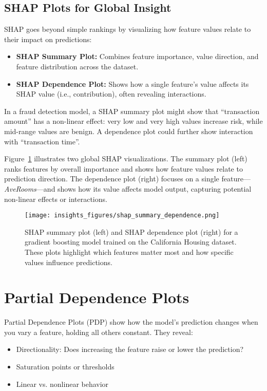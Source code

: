 \documentclass[12pt,openany, draft]{book}
\begin{document}
\subsection{SHAP Plots for Global Insight}

SHAP goes beyond simple rankings by visualizing how feature values relate to their impact on predictions:

\begin{itemize}
  \item \textbf{SHAP Summary Plot:} Combines feature importance, value direction, and feature distribution across the dataset.
  \item \textbf{SHAP Dependence Plot:} Shows how a single feature’s value affects its SHAP value (i.e., contribution), often revealing interactions.
\end{itemize}

\begin{examplebox}
In a fraud detection model, a SHAP summary plot might show that ``transaction amount'' has a non-linear effect: very low and very high values increase risk, while mid-range values are benign. A dependence plot could further show interaction with ``transaction time''.
\end{examplebox}


Figure~\ref{fig:shap-summary-dependence} illustrates two global SHAP visualizations. The summary plot (left) ranks features by overall importance and shows how feature values relate to prediction direction. The dependence plot (right) focuses on a single feature—\textit{AveRooms}—and shows how its value affects model output, capturing potential non-linear effects or interactions.

\begin{figure}[H]
    \centering
    \texttt{[image: insights\_figures/shap\_summary\_dependence.png]}
    \caption{SHAP summary plot (left) and SHAP dependence plot (right) for a gradient boosting model trained on the California Housing dataset. These plots highlight which features matter most and how specific values influence predictions.}
    \label{fig:shap-summary-dependence}
\end{figure}



\section{Partial Dependence Plots }

Partial Dependence Plots (PDP) show how the model's prediction changes when you vary a feature, holding all others constant. They reveal:
\begin{itemize}
  \item Directionality: Does increasing the feature raise or lower the prediction?
  \item Saturation points or thresholds
  \item Linear vs. nonlinear behavior
\end{itemize}
\end{document}

